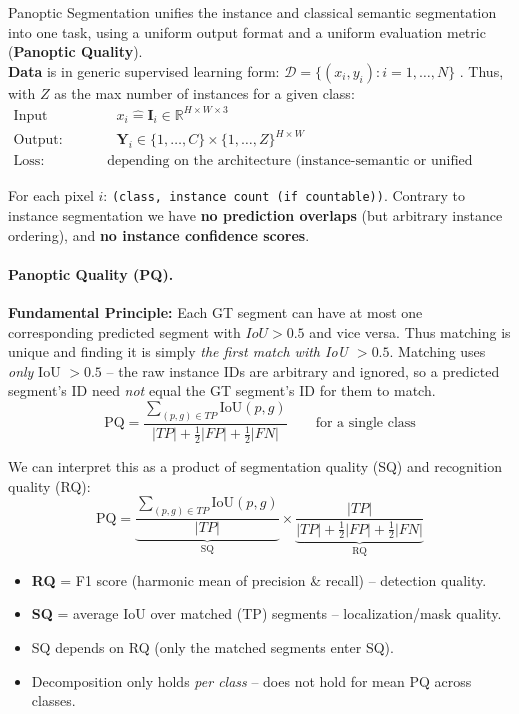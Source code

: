 \documentclass{article}
\begin{document}
Panoptic Segmentation unifies the instance and classical semantic segmentation into one task, using a uniform output format and a uniform evaluation metric (\textbf{Panoptic Quality}).\\
\textbf{Data} is in generic supervised learning form: $\mathcal{D} = \{(x_i,y_i): i = 1, \dots, N\}$ . Thus, with $Z$ as the max number of instances for a given class: 
\begin{align*}
    \text{Input (RGB):}& \quad x_i \mathrel{\hat{=}} \mathbf{I}_i \in \mathbb{R}^{H\times W \times 3}\\
    \text{Output:} &\quad \mathbf{Y}_i \in \{1,\dots, C\}\times \{1, \dots, Z\}^{H \times W}\\
    \text{Loss:}& \text{ depending on the architecture (instance-semantic or unified mask-based)}
\end{align*}

For each pixel $i$: \texttt{(class, instance count (if countable))}. Contrary to instance segmentation we have \textbf{no prediction overlaps} (but arbitrary instance ordering), and \textbf{no instance confidence scores}.\\


\paragraph{Panoptic Quality (PQ).}
\textbf{Fundamental Principle:} Each GT segment can have at most one corresponding predicted segment with $IoU > 0.5$ and vice versa. Thus matching is unique and finding it is simply \textit{the first match with IoU $> 0.5$}. Matching uses \textit{only} IoU $>0.5$ -- the raw instance IDs are arbitrary and ignored, so a predicted segment's ID need \textit{not} equal the GT segment's ID for them to match.\\
$$
\text{PQ} = \frac{\sum_{(p,g) \in TP} \text{IoU}(p,g)}{|TP| + \tfrac{1}{2}|FP| + \tfrac{1}{2}|FN|} \qquad \text{for a single class}
$$

We can interpret this as a product of segmentation quality (SQ) and recognition quality (RQ):
$$
\text{PQ} = \underbrace{\frac{\sum_{(p,g) \in TP} \text{IoU}(p,g)}{|TP|}}_{\text{SQ}} \times \underbrace{\frac{|TP|}{|TP| + \tfrac{1}{2}|FP| + \tfrac{1}{2}|FN|}}_{\text{RQ}}
$$
\begin{itemize}
    \item \textbf{RQ} = F1 score (harmonic mean of precision \& recall) -- detection quality.
    \item \textbf{SQ} = average IoU over matched (TP) segments -- localization/mask quality.
    \item SQ depends on RQ (only the matched segments enter SQ).
    \item Decomposition only holds \textit{per class} -- does not hold for mean PQ across classes.
\end{itemize}
\end{document}
